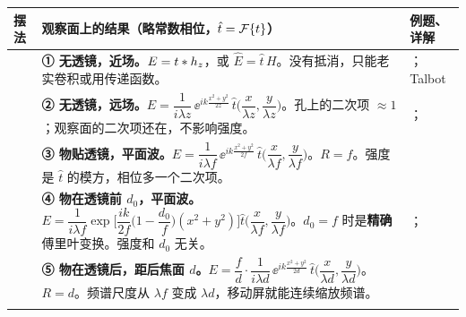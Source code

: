 \begingroup\small\renewcommand{\arraystretch}{1.3}
\begin{longtable}{@{}P{3.3cm}P{9.9cm}P{3.0cm}@{}}
\toprule
摆法 & 观察面上的结果（略常数相位，$\hat t=\mathcal{F}\{t\}$） & 例题、详解\\ \midrule
\endhead
{}
& \textbf{① 无透镜，近场。}$E=t\ast h_z$，或 $\hat E=\hat t\,H$。\newline 没有抵消，只能老实卷积或用传递函数。
& \pageref{ex:approxcmp}；Talbot \pageref{ex:talbot}\\ \addlinespace
{}
& \textbf{② 无透镜，远场。}$E=\dfrac{1}{i\lambda z}\,\ee^{ik\frac{x^2+y^2}{2z}}\,\hat t\Big(\dfrac{x}{\lambda z},\dfrac{y}{\lambda z}\Big)$。\newline 孔上的二次项 $\approx1$；观察面的二次项还在，不影响强度。
& \pageref{ex:v-approx}；\pageref{box:approx}\\ \addlinespace
{}
& \textbf{③ 物贴透镜，平面波。}$E=\dfrac{1}{i\lambda f}\,\ee^{ik\frac{x^2+y^2}{2f}}\,\hat t\Big(\dfrac{x}{\lambda f},\dfrac{y}{\lambda f}\Big)$。\newline $R=f$。强度是 $\hat t$ 的模方，相位多一个二次项。
& \pageref{sec:lensFTderiv}\\ \addlinespace
{}
& \textbf{④ 物在透镜前 $d_0$，平面波。}$E=\dfrac{1}{i\lambda f}\exp\!\Big[\dfrac{ik}{2f}\Big(1-\dfrac{d_0}{f}\Big)(x^2+y^2)\Big]\hat t\Big(\dfrac{x}{\lambda f},\dfrac{y}{\lambda f}\Big)$。\newline $d_0=f$ 时是\textbf{精确}傅里叶变换。强度和 $d_0$ 无关。
& \pageref{sec:lensFT}；\pageref{ex:screenpos}\\ \addlinespace
{}
& \textbf{⑤ 物在透镜后，距后焦面 $d$。}$E=\dfrac{f}{d}\cdot\dfrac{1}{i\lambda d}\,\ee^{ik\frac{x^2+y^2}{2d}}\,\hat t\Big(\dfrac{x}{\lambda d},\dfrac{y}{\lambda d}\Big)$。\newline $R=d$。频谱尺度从 $\lambda f$ 变成 $\lambda d$，移动屏就能连续缩放频谱。
& \pageref{ex:screenpos}\\ \addlinespace
{}

\end{longtable}
